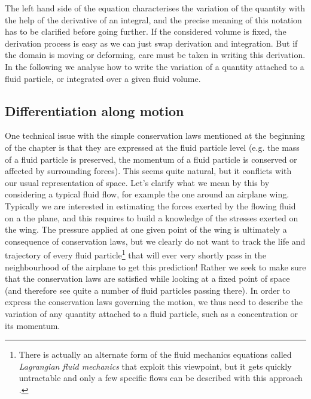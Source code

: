 The left hand side of the equation characterises the variation of the quantity with the help of the derivative of an integral, and the precise meaning of this notation has to be clarified before going further. If the considered volume is fixed, the derivation process is easy as we can just swap derivation and integration. But if the domain is moving or deforming, care must be taken in writing this derivation. In the following we analyse how to write the variation of a quantity attached to a fluid particle, or integrated over a given fluid volume.

\subsection{Differentiation along motion}
One technical issue with the simple conservation laws mentioned at the beginning of the chapter is that they are expressed at the fluid particle level (e.g. the mass of a fluid particle is preserved, the momentum of a fluid particle is conserved or affected by surrounding forces). This seems quite natural, but it conflicts with our usual representation of space. Let's clarify what we mean by this by considering a typical fluid flow, for example the one around an airplane wing. Typically we are interested in estimating the forces exerted by the flowing fluid on a the plane, and this requires to build a knowledge of the stresses exerted on the wing. The pressure applied at one given point of the wing is ultimately a consequence of conservation laws, but we clearly do not want to track the life and trajectory of every fluid particle\footnote{There is actually an alternate form of the fluid mechanics equations called \textit{Lagrangian fluid mechanics} that exploit this viewpoint, but it gets quickly untractable and only a few specific flows can be described with this approach \citep{Bennett2006}.} that will ever very shortly pass in the neighbourhood of the airplane to get this prediction! Rather we seek to make sure that the conservation laws are satisfied while looking at a fixed point of space (and therefore see quite a number of fluid particles passing there). In order to express the conservation laws governing the motion, we thus need to describe the variation of any quantity attached to a fluid particle, such as a concentration or its momentum.

